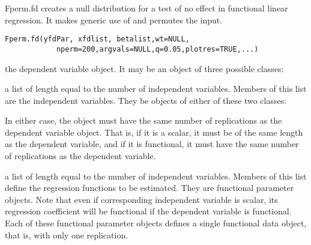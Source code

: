 \begin{Description}\relax
Fperm.fd creates a null distribution for a test of no effect in functional
linear regression. It makes generic use of  and permutes the
 input.
\end{Description}
\begin{Usage}
\begin{verbatim}
Fperm.fd(yfdPar, xfdlist, betalist,wt=NULL,
            nperm=200,argvals=NULL,q=0.05,plotres=TRUE,...)
\end{verbatim}
\end{Usage}
\begin{Arguments}
\begin{ldescription}
\item[\code{yfdPar}] the dependent variable object.  It may be an object of
three possible classes:

\item[\code{xfdlist}] a list of length equal to the number of independent variables. Members
of this list are the independent variables.  They be objects of either
of these two classes:


In either case, the object must have the same number of replications as
the dependent variable object.  That is, if it is a scalar, it must be
of the same length as the dependent variable, and if it is functional,
it must have the same number of replications as the dependent variable.

\item[\code{betalist}] a list of length equal to the number of independent variables. Members
of this list define the regression functions to be estimated.
They are functional parameter objects.  Note that even if corresponding
independent variable is scalar, its regression coefficient will be
functional if the dependent variable is functional.  Each of these
functional parameter objects defines a single functional data object,
that is, with only one replication.


\end{ldescription}
\end{Arguments}
